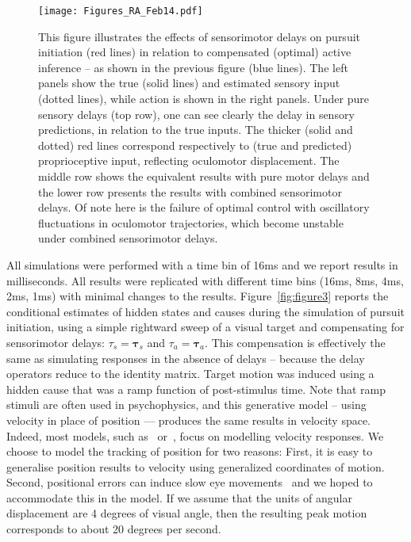 \documentclass[a4paper]{article} %
\begin{document}
\begin{figure}%
 \centerline{%
 \texttt{[image: Figures\_RA\_Feb14.pdf]} %
}%
\caption{This figure illustrates the effects of sensorimotor
delays on pursuit initiation (red lines) in relation to compensated
(optimal) active inference -- as shown in the previous figure (blue
lines). The left panels show the true (solid lines) and estimated
sensory input (dotted lines), while action is shown in the right panels.
Under pure sensory delays (top row), one can see clearly the delay in
sensory predictions, in relation to the true inputs. The thicker (solid
and dotted) red lines correspond respectively to (true and predicted)
proprioceptive input, reflecting oculomotor displacement. The middle row
shows the equivalent results with pure motor delays and the lower row
presents the results with combined sensorimotor delays. Of note here is
the failure of optimal control with oscillatory fluctuations in
oculomotor trajectories, which become unstable under combined
sensorimotor delays.}%
\label{fig:figure4}
\end{figure}
All simulations were performed with a time bin of 16ms and we report results in milliseconds. All results were replicated with different time bins (16ms, 8ms, 4ms, 2ms, 1ms) with minimal changes to the results. %
Figure~\ref{fig:figure3} reports the conditional estimates of hidden states and causes
during the simulation of pursuit initiation, using a simple rightward
sweep of a visual target and compensating for sensorimotor delays:
$\tau_s = \bm{\tau}_s $ and
$\tau_a = \bm{\tau}_a$.
This compensation is effectively the same as simulating responses in the
absence of delays -- because the delay operators reduce to the identity
matrix. Target motion was induced using a hidden cause that was a ramp
function of post-stimulus time. Note that ramp stimuli are often used in
psychophysics, and this generative model -- using velocity in place of
position --- produces the same results in velocity space. Indeed, most
models, such as~\citep{Robinson86} or~\citep{Krauzlis89},
focus on modelling velocity responses. We choose to model the tracking
of position for two reasons: First, it is easy to generalise position
results to velocity using generalized coordinates of motion. Second,
positional errors can induce slow eye movements~\citep{Kowler79,Wyatt81} and we hoped to accommodate this in the
model. If we assume that the units of angular displacement are 4 degrees of visual angle, then
the resulting peak motion corresponds to about 20 degrees per second.
\end{document}
